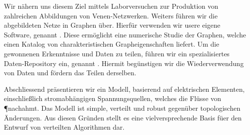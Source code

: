 	Wir n\"ahern uns diesem Ziel mittels Laborversuchen zur Produktion von zahlreichen Abbildungen von Venen-Netzwerken. Weiters f\"uhren wir die abgebildeten Netze in Graphen \"uber. Hierf\"ur verwenden wir usere eigene Software, genannt \NEFI. Diese erm\"oglicht eine numerische Studie der Graphen, welche einen Katalog von charakteristischen Grapheigenschaften liefert. Um die gewonnenen Erkenntnisse und Daten zu teilen, f\"uhren wir ein spezialisiertes Daten-Repository ein, genannt \SMGR. Hiermit beg\"unstigen wir die Wiederverwendung von Daten und f\"ordern das Teilen derselben.

	Abschliessend pr\"asentieren wir ein Modell, basierend auf elektrischen Elementen, einschlie{\ss}lich stromabh\"angigen Spannungsquellen, welches die Fl\"usse von \P nachahmt. Das Modell ist simple, verteilt und robust gegen\"uber topologischen \"Anderungen. Aus diesen Gr\"unden stellt es eine vielversprechende Basis f\"uer den Entwurf von verteilten Algorithmen dar.


\vfill
